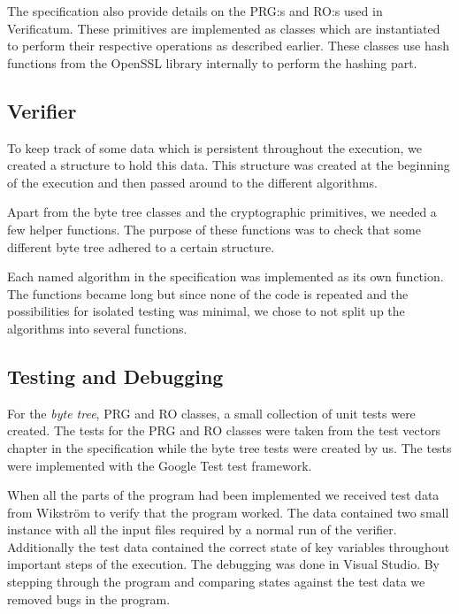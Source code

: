 The specification also provide details on the PRG:s and RO:s used in
Verificatum. These primitives are implemented as classes which are
instantiated to perform their respective operations as described
earlier. These classes use hash functions from the OpenSSL library
internally to perform the hashing part.

\subsection{Verifier}

To keep track of some data which is persistent throughout the
execution, we created a structure to hold this data. This structure
was created at the beginning of the execution and then passed around
to the different algorithms.

Apart from the byte tree classes and the cryptographic primitives, we
needed a few helper functions. The purpose of these functions was to
check that some different byte tree adhered to a certain structure.

Each named algorithm in the specification was implemented as its own
function. The functions became long but since none of the code is
repeated and the possibilities for isolated testing was minimal, we
chose to not split up the algorithms into several functions.

\subsection{Testing and Debugging}

For the \emph{byte tree}, PRG and RO classes, a small collection of
unit tests were created. The tests for the PRG and RO classes were
taken from the test vectors chapter in the specification while the
byte tree tests were created by us. The tests were implemented with
the Google Test test framework.

When all the parts of the program had been implemented we received
test data from Wikström to verify that the program worked. The data
contained two small instance with all the input files required by a
normal run of the verifier. Additionally the test data contained the
correct state of key variables throughout important steps of the
execution. The debugging was done in Visual Studio. By stepping
through the program and comparing states against the test data we
removed bugs in the program.
